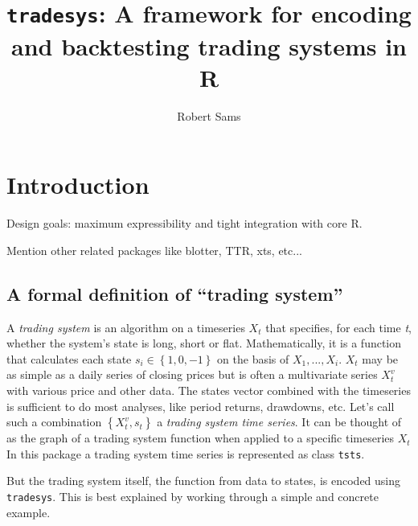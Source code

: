 \documentclass[a4]{article}
\newcommand{\code}[1]{\texttt{#1}}
\begin{document}
\author{Robert Sams}
\title{\code{tradesys}: A framework for encoding and backtesting trading systems in R}
\maketitle



\section{Introduction} \label{sec:intro}
Design goals: maximum expressibility and tight integration with core R.

Mention other related packages like blotter, TTR, xts, etc...

\subsection{A formal definition of ``trading system''}
A \emph{trading system} is an algorithm on a timeseries $X_{t}$ that
specifies, for each time \emph{t}, whether the system's state is long,
short or flat. Mathematically, it is a function that calculates each
state $s_{i} \in \left\{1,0,-1\right\}$ on the basis of $X_{1}, ...,
X_{i}$. $X_{t}$ may be as simple as a daily series of closing prices
but is often a multivariate series $X_{t}^{v}$ with various price and
other data. The states vector combined with the timeseries is
sufficient to do most analyses, like period returns, drawdowns,
etc. Let's call such a combination $\left\{X_{t}^{v}, s_{t}\right\}$ a
\emph{trading system time series}. It can be thought of as the graph
of a trading system function when applied to a specific timeseries
$X_{t}$ In this package a trading system time series is represented as
class \code{tsts}.

But the trading system itself, the function from data to states, is
encoded using \code{tradesys}. This is best explained by working
through a simple and concrete example.
\end{document}
